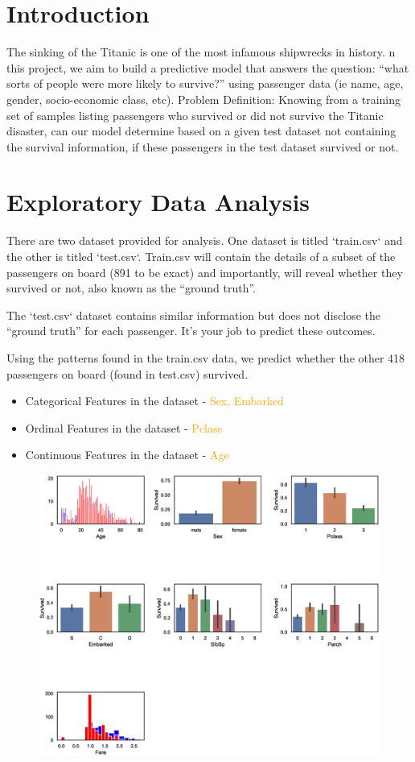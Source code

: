 \section{Introduction}\label{sec-intro}
The sinking of the Titanic is one of the most infamous shipwrecks in history.
n this project, we aim to build a predictive model that answers the question: “what sorts of people were more likely to survive?” using passenger data (ie name, age, gender, socio-economic class, etc).
Problem Definition: Knowing from a training set of samples listing passengers who survived or did not survive the Titanic disaster, can our model determine based on a given test dataset not containing the survival information, if these passengers in the test dataset survived or not.

\section{Exploratory Data Analysis} \label{sec-preliminaries}

There are two dataset provided for analysis. 
One dataset is titled `train.csv` and the other is titled `test.csv`.
Train.csv will contain the details of a subset of the passengers on board (891 to be exact) and importantly, will reveal whether they survived or not, also known as the “ground truth”.

The `test.csv` dataset contains similar information but does not disclose the “ground truth” for each passenger. It’s your job to predict these outcomes.

Using the patterns found in the train.csv data, we predict whether the other 418 passengers on board (found in test.csv) survived.
\begin{itemize}
\item
Categorical Features in the dataset - \textcolor{orange}{Sex, Embarked}
\item
Ordinal Features in the dataset - \textcolor{orange}{Pclass}
\item
Continuous Features in the dataset - \textcolor{orange}{Age}
\end{itemize}
\begin{figure}
  \centering
  \centerline{\includegraphics[width=1.0\textwidth,height=0.5\textwidth]{./graphics/titanicimg/allfeatures.eps}}
\end{figure}

